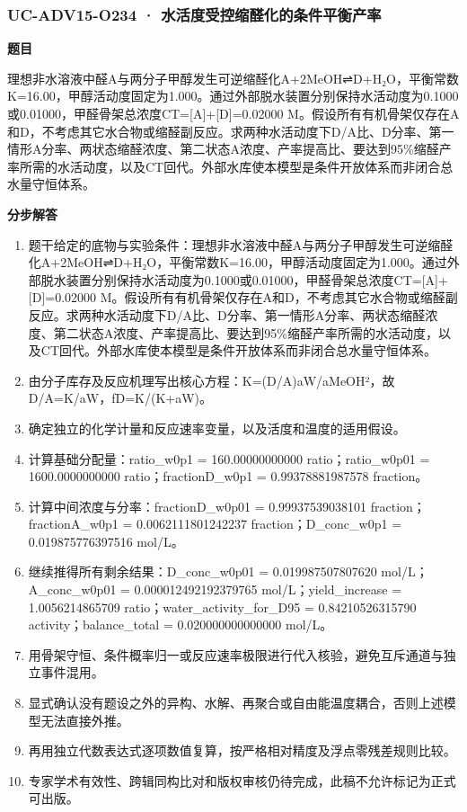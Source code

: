 \documentclass[UTF8,11pt,a4paper]{ctexart}
\begin{document}
\subsubsection*{UC-ADV15-O234 · 水活度受控缩醛化的条件平衡产率}
\noindent\textbf{题目}\par
理想非水溶液中醛A与两分子甲醇发生可逆缩醛化A+2MeOH⇌D+H₂O，平衡常数K=16.00，甲醇活动度固定为1.000。通过外部脱水装置分别保持水活动度为0.1000或0.01000，甲醛骨架总浓度CT=[A]+[D]=0.02000 M。假设所有有机骨架仅存在A和D，不考虑其它水合物或缩醛副反应。求两种水活动度下D/A比、D分率、第一情形A分率、两状态缩醛浓度、第二状态A浓度、产率提高比、要达到95\%缩醛产率所需的水活动度，以及CT回代。外部水库使本模型是条件开放体系而非闭合总水量守恒体系。\par
\medskip\noindent\textbf{分步解答}
\begin{enumerate}
\item 题干给定的底物与实验条件：理想非水溶液中醛A与两分子甲醇发生可逆缩醛化A+2MeOH⇌D+H₂O，平衡常数K=16.00，甲醇活动度固定为1.000。通过外部脱水装置分别保持水活动度为0.1000或0.01000，甲醛骨架总浓度CT=[A]+[D]=0.02000 M。假设所有有机骨架仅存在A和D，不考虑其它水合物或缩醛副反应。求两种水活动度下D/A比、D分率、第一情形A分率、两状态缩醛浓度、第二状态A浓度、产率提高比、要达到95\%缩醛产率所需的水活动度，以及CT回代。外部水库使本模型是条件开放体系而非闭合总水量守恒体系。
\item 由分子库存及反应机理写出核心方程：K=(D/A)aW/aMeOH²，故D/A=K/aW，fD=K/(K+aW)。
\item 确定独立的化学计量和反应速率变量，以及活度和温度的适用假设。
\item 计算基础分配量：ratio\_w0p1 = 160.00000000000 ratio；ratio\_w0p01 = 1600.0000000000 ratio；fractionD\_w0p1 = 0.99378881987578 fraction。
\item 计算中间浓度与分率：fractionD\_w0p01 = 0.99937539038101 fraction；fractionA\_w0p1 = 0.0062111801242237 fraction；D\_conc\_w0p1 = 0.019875776397516 mol/L。
\item 继续推得所有剩余结果：D\_conc\_w0p01 = 0.019987507807620 mol/L；A\_conc\_w0p01 = 0.000012492192379765 mol/L；yield\_increase = 1.0056214865709 ratio；water\_activity\_for\_D95 = 0.84210526315790 activity；balance\_total = 0.020000000000000 mol/L。
\item 用骨架守恒、条件概率归一或反应速率极限进行代入核验，避免互斥通道与独立事件混用。
\item 显式确认没有题设之外的异构、水解、再聚合或自由能温度耦合，否则上述模型无法直接外推。
\item 再用独立代数表达式逐项数值复算，按严格相对精度及浮点零残差规则比较。
\item 专家学术有效性、跨辑同构比对和版权审核仍待完成，此稿不允许标记为正式可出版。
\end{enumerate}
\end{document}
